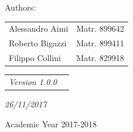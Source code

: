 \documentclass[a4paper,12pt,twoside]{report}
\begin{document}
\begin{center}
\begin{center}
\vspace{10mm}
Authors:
\vspace{-3mm}
\end{center}
\begin{center}
\begin{tabular}{l l }
Alessandro Aimi & Matr. 899642 \\
Roberto Bigazzi & Matr. 899411 \\
Filippo Collini & Matr. 829918
\end{tabular}
\end{center}
\vspace{10mm}

\begin{center}
\begin{tabular}{l l }
\it{Version 1.0.0} \\
\end{tabular}
\end{center}
\begin{center}
\vspace{-4mm}
\it{26/11/2017}
\end{center}
\vspace{-4mm}
{\large{Academic Year 2017-2018}}
\end{center}

\end{document}
